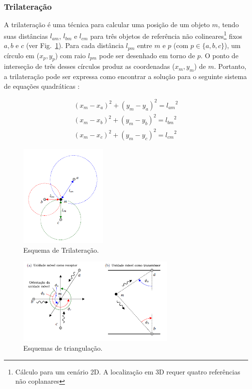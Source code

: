 \subsubsection{Trilateração}\label{sec:trilat}
A trilateração é uma técnica para calcular uma posição de um objeto $m$, tendo suas distâncias $l_{am}$, $l_{bm}$ e $l_{cm}$ para três objetos de referência não colineares\footnote{ Cálculo para um cenário 2D. A localização em 3D requer quatro referências não coplanares} fixos $a, b$ e $c$ (ver Fig.~\ref{fig:trilateracao}). Para cada distância $l_{pm}$ entre $m$ e $p$ (com $p \in \{a, b, c\}$), um círculo em ($x_{p}, y_{p}$) com raio $l_{pm}$ pode ser desenhado em torno de $p$. O ponto de interseção de três desses círculos produz as coordenadas ($x_{m}, y_{m}$) de $m$. Portanto, a trilateração pode ser expressa como encontrar a solução para o seguinte sistema de equações quadráticas \cite{linde2006aspects}:

\begin{align*}
(x_{m}-x_{a})^{2} + (y_{m}-y_{a})^{2} = {l_{am}}^{2}\\
(x_{m}-x_{b})^{2} + (y_{m}-y_{b})^{2} = {l_{bm}}^{2}\\
(x_{m}-x_{c})^{2} + (y_{m}-y_{c})^{2} = {l_{cm}}^{2}
\end{align*}



 \begin{figure}[h]
\centering
    \includegraphics[resolution=300,width=0.39\textwidth,natwidth=610,natheight=642]{images/trilateracao.png}
    \caption{Esquema de Trilateração.}
    \label{fig:trilateracao}
\end{figure}


\begin{figure}[ht]
\centering
\includegraphics[resolution=300,width=0.7\textwidth,natwidth=610,natheight=642]{images/triangulacao.png}
    \caption{Esquemas de triangulação.}
    \label{fig:triang}
\end{figure}

